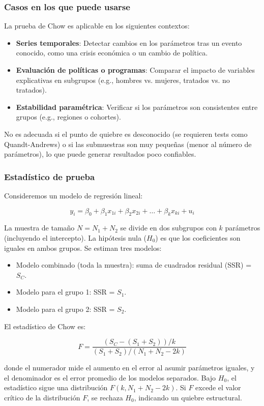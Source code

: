 \documentclass[12pt]{article}
\begin{document}
\subsubsection*{Casos en los que puede usarse}
La prueba de Chow es aplicable en los siguientes contextos:
\begin{itemize}
    \item \textbf{Series temporales}: Detectar cambios en los parámetros tras un evento conocido, como una crisis económica o un cambio de política.
    \item \textbf{Evaluación de políticas o programas}: Comparar el impacto de variables explicativas en subgrupos (e.g., hombres vs. mujeres, tratados vs. no tratados).
    \item \textbf{Estabilidad paramétrica}: Verificar si los parámetros son consistentes entre grupos (e.g., regiones o cohortes).
\end{itemize}
No es adecuada si el punto de quiebre es desconocido (se requieren tests como Quandt-Andrews) o si las submuestras son muy pequeñas (menor al número de parámetros), lo que puede generar resultados poco confiables.

\subsubsection*{Estadístico de prueba}
Consideremos un modelo de regresión lineal:

\[
y_i = \beta_0 + \beta_1 x_{1i} + \beta_2 x_{2i} + \dots + \beta_k x_{ki} + u_i
\]

La muestra de tamaño \( N = N_1 + N_2 \) se divide en dos subgrupos con \( k \) parámetros (incluyendo el intercepto). La hipótesis nula (\( H_0 \)) es que los coeficientes son iguales en ambos grupos. Se estiman tres modelos:
\begin{itemize}
    \item Modelo combinado (toda la muestra): suma de cuadrados residual (SSR) = \( S_C \).
    \item Modelo para el grupo 1: SSR = \( S_1 \).
    \item Modelo para el grupo 2: SSR = \( S_2 \).
\end{itemize}

El estadístico de Chow es:

\[
F = \frac{(S_C - (S_1 + S_2)) / k}{(S_1 + S_2) / (N_1 + N_2 - 2k)}
\]

donde el numerador mide el aumento en el error al asumir parámetros iguales, y el denominador es el error promedio de los modelos separados. Bajo \( H_0 \), el estadístico sigue una distribución \( F(k, N_1 + N_2 - 2k) \). Si \( F \) excede el valor crítico de la distribución \( F \), se rechaza \( H_0 \), indicando un quiebre estructural.
\end{document}
